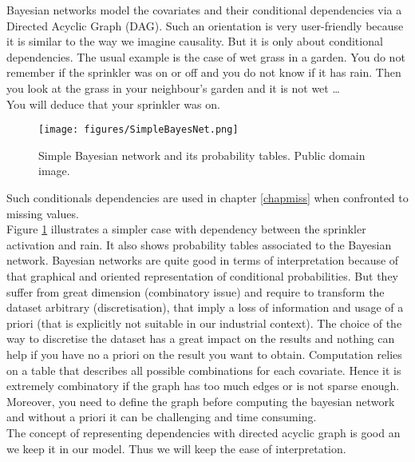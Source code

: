 \documentclass[12pt,a4paper]{report}
\begin{document}
		Bayesian networks \cite{heckerman1995learning,jensen2007bayesian,friedman2000using} model the covariates and their conditional dependencies via a Directed Acyclic Graph (DAG). 
		Such an orientation is very user-friendly because it is similar to the way we imagine causality. 
		But it is only about conditional dependencies. %
		The usual example is the case of wet grass in a garden.
		 You do not remember if the sprinkler was on or off and you do not know if it has rain.%
		 Then you look at the grass in your neighbour's garden and it is not wet \dots \\
		You will deduce that your sprinkler was on. 
\begin{figure}
	\centering
	\texttt{[image: figures/SimpleBayesNet.png]}\label{basicBayes}
	\caption{Simple Bayesian network and its probability tables. Public domain image.}
\end{figure}		
		Such conditionals dependencies are used in chapter \ref{chapmiss} when confronted to missing values. \\
		
		Figure \ref{basicBayes} illustrates a simpler case with dependency between the sprinkler activation and rain. It also shows probability tables associated to the Bayesian network.
		Bayesian networks are quite good in terms of interpretation because of that graphical and oriented representation of conditional probabilities. 
		But they suffer from great dimension (combinatory issue) and require to transform the dataset arbitrary (discretisation), that imply a loss of information and usage of a priori (that is explicitly not suitable in our industrial context). 
		The choice of the way to discretise the dataset has a great impact on the results and nothing can help if you have no a priori on the result you want to obtain. 
		Computation relies on a table that describes all possible combinations for each covariate. 
		Hence it is extremely combinatory if the graph has too much edges or is not sparse enough. 
		Moreover, you need to define the graph before computing the bayesian network and without a priori it can be challenging and time consuming.\\
		
The concept of representing dependencies with directed acyclic graph is good an we keep it in our model. Thus we will keep the ease of interpretation.		
			
	
		
\end{document}
